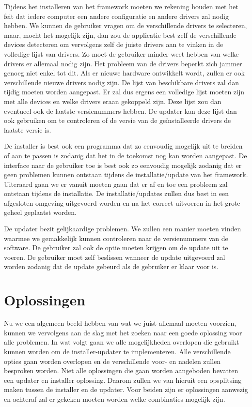 \documentclass{article}
\begin{document}
Tijdens het installeren van het framework moeten we rekening houden met het feit dat iedere computer een andere configuratie en andere drivers zal nodig hebben.
We kunnen de gebruiker vragen om de verschillende drivers te selecteren, maar, mocht het mogelijk zijn, dan zou de applicatie best zelf de verschillende devices detecteren om vervolgens zelf de juiste drivers aan te vinken in de volledige lijst van drivers.
Zo moet de gebruiker minder weet hebben van welke drivers er allemaal nodig zijn.
Het probleem van de drivers beperkt zich jammer genoeg niet enkel tot dit.
Als er nieuwe hardware ontwikkelt wordt, zullen er ook verschillende nieuwe drivers nodig zijn.
De lijst van beschikbare drivers zal dan tijdig moeten worden aangepast.
Er zal dus ergens een volledige lijst moeten zijn met alle devices en welke drivers eraan gekoppeld zijn.
Deze lijst zou dan eventueel ook de laatste versienummers hebben.
De updater kan deze lijst dan ook gebruiken om te controleren of de versie van de ge\"installeerde drivers de laatste versie is.

De installer is best ook een programma dat zo eenvoudig mogelijk uit te breiden of aan te passen is zodanig dat het in de toekomst nog kan worden aangepast. 
De interface naar de gebruiker toe is best ook zo eenvoudig mogelijk zodanig dat er geen problemen kunnen ontstaan tijdens de installatie/update van het framework.
Uiteraard gaan we er vanuit moeten gaan dat er af en toe een probleem zal ontstaan tijdens de installatie.
De installatie/updates zullen dus best in een afgesloten omgeving uitgevoerd worden en na het correct uitvoeren in het grote geheel geplaatst worden.

De updater bezit gelijkaardige problemen.
We zullen een manier moeten vinden waarmee we gemakkelijk kunnen controleren naar de versienummers van de software.
De gebruiker zal ook de optie moeten krijgen om de update uit te voeren.
De gebruiker moet zelf beslissen wanneer de update uitgevoerd zal worden zodanig dat de update gebeurd als de gebruiker er klaar voor is.

\section{Oplossingen}
Nu we een algemeen beeld hebben van wat we juist allemaal moeten voorzien, kunnen we vervolgens aan de slag met het zoeken naar een goede oplossing voor alle problemen.
In wat volgt gaan we alle mogelijkheden overlopen die gebruikt kunnen worden om de installer-updater te implementeren.
Alle verschillende opties gaan worden overlopen en de verschillende voor- en nadelen zullen besproken worden.
Niet alle oplossingen die gaan worden aangeboden bevatten een updater en installer oplossing.
Daarom zullen we van hieruit een opsplitsing maken tussen de installer en de updater.
Voor beiden zijn er oplossingen aanwezig en achteraf zal er gekeken moeten worden welke combinaties mogelijk zijn.
\end{document}
